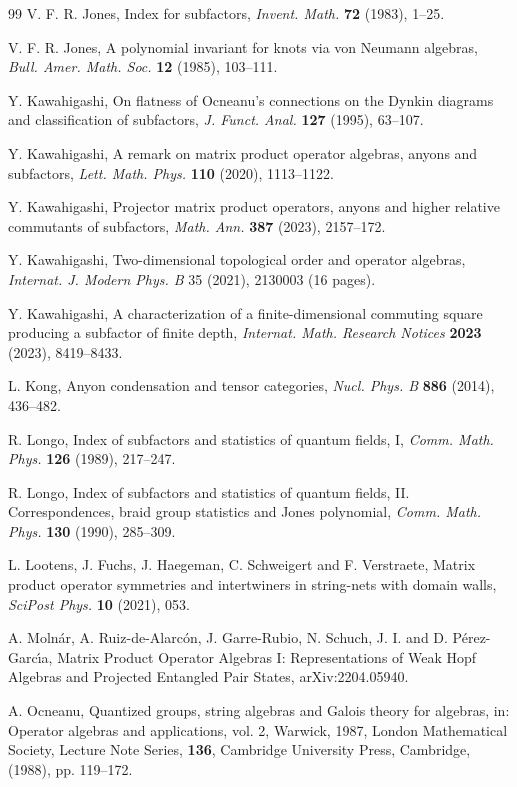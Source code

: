 \documentclass[12pt]{article}
\begin{document}
\begin{thebibliography}{99}
V. F. R. Jones, Index for subfactors, 
\textit{Invent. Math.} {\bf 72} (1983), 1--25.

V. F. R. Jones,
A polynomial invariant for knots via von Neumann algebras,
\textit{Bull. Amer. Math. Soc.} {\bf 12} (1985), 103--111. 

Y. Kawahigashi, On flatness of Ocneanu's connections on the 
Dynkin diagrams and classification of subfactors, 
\textit{J. Funct. Anal.} {\bf 127} (1995), 63--107.

Y. Kawahigashi,
A remark on matrix product operator algebras, anyons and subfactors,
\textit{Lett. Math. Phys.} {\bf 110} (2020), 1113--1122.

Y. Kawahigashi,
Projector matrix product operators, anyons and
higher relative commutants of subfactors,
\textit{Math. Ann.} {\bf 387} (2023), 2157--172.

Y. Kawahigashi, Two-dimensional topological order and operator algebras,
\textit{Internat. J. Modern Phys. B} 35 (2021), 2130003 (16 pages).

Y. Kawahigashi, 
A characterization of a finite-dimensional commuting square
producing a subfactor of finite depth,
\textit{Internat. Math. Research Notices} {\bf 2023}
(2023), 8419--8433.

L. Kong, Anyon condensation and tensor categories,
\textit{Nucl. Phys. B} {\bf 886} (2014), 436--482.

 R. Longo,
Index of subfactors and statistics of quantum fields, I,
\textit{Comm. Math. Phys.} {\bf 126} (1989), 217--247.

 R. Longo,
Index of subfactors and statistics of quantum fields, II.
Correspondences, braid group statistics and Jones polynomial,
\textit{Comm. Math. Phys.}  {\bf 130} (1990), 285--309.

L. Lootens, J. Fuchs, J. Haegeman, C. Schweigert and F. Verstraete,
Matrix product operator symmetries and intertwiners in string-nets 
with domain walls, 
\textit{SciPost Phys.} {\bf 10} (2021), 053.

A. Moln\'ar,  A. Ruiz-de-Alarc\'on, J. Garre-Rubio, N. Schuch, 
J. I. and D. P\'erez-Garc\'\i a,
Matrix Product Operator Algebras I: 
Representations of Weak Hopf Algebras and Projected Entangled Pair States,
arXiv:2204.05940.

A. Ocneanu, 
Quantized groups, string algebras and Galois theory for algebras,
in: Operator algebras and applications, vol. 2, Warwick, 1987,
London Mathematical Society, Lecture Note Series, {\bf 136},
Cambridge University Press, Cambridge, (1988), pp. 119--172. 


\end{thebibliography}
\end{document}
